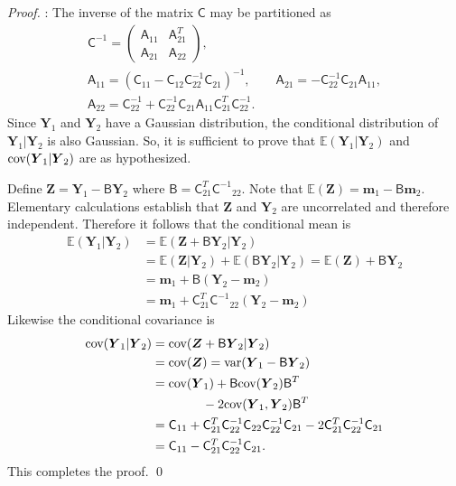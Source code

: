 \documentclass[twocolumn]{svjour3}          %
\newcommand{\bm}[1]{\boldsymbol{#1}}
\newcommand{\mB}{\mathsf{B}}
\newcommand{\Ex}{\mathbb{E}}
\newcommand{\vm}{\bm{m}}
\newcommand{\vY}{\bm{Y}}
\newcommand{\vZ}{\bm{Z}}
\newcommand{\mA}{\mathsf{A}}
\newcommand{\mC}{\mathsf{C}}
\newcommand{\mCInv}{{\mathsf{C}^{-1}}}
\newcommand{\cov}{{\textup{cov}}}
\newcommand{\var}{{\textup{var}}}
\begin{document}
\begin{proof}:
The inverse of the matrix $\mC$ may be partitioned as \cite{???}
	\begin{gather*}
	\mC^{-1} = \begin{pmatrix} \mA_{11} & \mA_{21}^T \\ \mA_{21} & \mA_{22} \end{pmatrix}, \\
	\mA_{11} = (\mC_{11} - \mC_{12} \mC_{22}^{-1} \mC_{21})^{-1}, \qquad 
	\mA_{21} = -  \mC_{22}^{-1} \mC_{21} \mA_{11}, \\ 
	\mA_{22} = \mC_{22}^{-1} + \mC_{22}^{-1} \mC_{21} \mA_{11} \mC_{21}^T \mC_{22}^{-1}.
	\end{gather*}
Since $\vY_1$ and $\vY_2$ have a Gaussian distribution, the conditional distribution of $\vY_1 \vert \vY_2$ is also Gaussian. So, it is sufficient to prove that $\Ex(\vY_1 \vert \vY_2)$ and $\cov(\vY_1 \vert \vY_2)$ are as hypothesized.

Define $\vZ=\vY_1- \mB \vY_2$ where $\mB=\mC_{21}^T \mCInv_{22}$. Note that $\Ex(\vZ) = \vm_1 - \mB \vm_2$.  Elementary calculations establish that $\vZ$ and $\vY_2$ are uncorrelated and therefore independent.   Therefore it follows that the conditional mean is
\begin{align*}
\Ex(\vY_1 \vert \vY_2) &= \Ex(\vZ + \mB \vY_2 \vert \vY_2) 
\\ & = \Ex(\vZ \vert \vY_2) + \Ex(\mB \vY_2 \vert \vY_2) 
= \Ex(\vZ) + \mB\vY_2 
\\
& = \vm_1 + \mB (\vY_2 - \vm_2) \\
& =  \vm_1+ \mC_{21}^T \mCInv_{22}(\vY_2 - \vm_2)
\end{align*}
Likewise the conditional covariance is 
\begin{align*}
\cov(\vY_1|\vY_2) &=\cov(\vZ + \mB \vY_2|\vY_2) \\
& =\cov(\vZ) = \var(\vY_1 - \mB \vY_2)
\\
 & =\cov(\vY_1)+\mB\cov(\vY_2)\mB^T \\
 & \qquad  \qquad  - 2  \cov(\vY_1,\vY_2) \mB^T
\\
&=\mC_{11}+\mC_{21}^T\mC_{22}^{-1}\mC_{22}\mC_{22}^{-1}\mC_{21}-2\mC_{21}^T\mC_{22}^{-1}\mC_{21}
\\
&=\mC_{11}-\mC_{21}^T\mC_{22}^{-1}\mC_{21}.
\end{align*}
This completes the proof. \qed
\end{proof}


\end{document}
